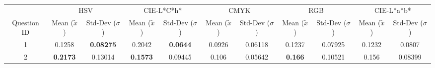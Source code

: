 \begin{table}[htbp]
  \resizebox{\textwidth}{!} {
  \begin{tabular}{@{}ccccccccccc@{}}
    \toprule
                                  & \multicolumn{2}{c}{HSV}                                                                                                                              & \multicolumn{2}{c}{CIE-L*C*h*}                                                                                               & \multicolumn{2}{c}{CMYK}                                                                                                     & \multicolumn{2}{c}{RGB}                                                                                                      & \multicolumn{2}{c}{CIE-L*a*b*}                                                                                               \\ \cmidrule(l){2-11}
    \multirow{-2}{*}{Question ID} & Mean ($\tilde{x}$)                                                                  & Std-Dev ($\sigma$)                                             & Mean ($\tilde{x}$)                                           & Std-Dev ($\sigma$)                                            & Mean ($\tilde{x}$)                                           & Std-Dev ($\sigma$)                                            & Mean ($\tilde{x}$)                                           & Std-Dev ($\sigma$)                                            & \multicolumn{1}{c|}{Mean ($\tilde{x}$)}                      & \multicolumn{1}{c|}{Std-Dev ($\sigma$)}                       \\ \midrule
    \multicolumn{1}{c|}{1}        & \multicolumn{1}{c|}{0.1258}                                                         & \multicolumn{1}{c||}{\cellcolor[HTML]{32CB00}\textbf{0.08275}}  & \multicolumn{1}{c|}{0.2042}                                  & \multicolumn{1}{c||}{\cellcolor[HTML]{32CB00}\textbf{0.0644}}  & \multicolumn{1}{c|}{0.0926}                                  & \multicolumn{1}{c||}{0.06118}                                  & \multicolumn{1}{c|}{0.1237}                                  & \multicolumn{1}{c||}{0.07925}                                  & \multicolumn{1}{c|}{0.1232}                                  & \multicolumn{1}{c|}{0.0807}                                   \\ \midrule
    \multicolumn{1}{c|}{2}        & \multicolumn{1}{c|}{\cellcolor[HTML]{FD6864}\textbf{0.2173}}                        & \multicolumn{1}{c||}{0.13014}                                   & \multicolumn{1}{c|}{\cellcolor[HTML]{32CB00}\textbf{0.1573}} & \multicolumn{1}{c||}{0.09445}                                  & \multicolumn{1}{c|}{0.106}                                   & \multicolumn{1}{c||}{0.05642}                                  & \multicolumn{1}{c|}{\cellcolor[HTML]{FD6864}\textbf{0.166}}  & \multicolumn{1}{c||}{0.10521}                                  & \multicolumn{1}{c|}{0.156}                                   & \multicolumn{1}{c|}{0.08399}                                  \\ \midrule \midrule

\end{tabular}}
\end{table}
